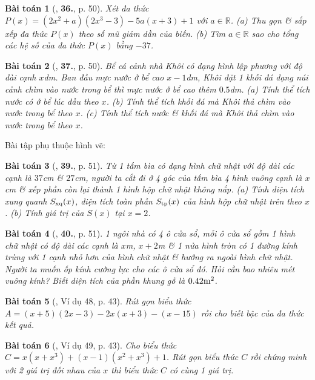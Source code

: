 \documentclass{article}
\numberwithin{equation}{section}
\newtheorem{baitoan}{Bài toán}
\begin{document}
\begin{baitoan}[\cite{SBT_Toan_7_Canh_Dieu_tap_2}, \textbf{36.}, p. 50]
	Xét đa thức $P(x) = (2x^2 + a)(2x^3 - 3) - 5a(x + 3) + 1$ với $a\in\mathbb{R}$. (a) Thu gọn \& sắp xếp đa thức $P(x)$ theo số mũ giảm dần của biến. (b) Tìm $a\in\mathbb{R}$ sao cho tổng các hệ số của đa thức $P(x)$ bằng $-37$.
\end{baitoan}

\begin{baitoan}[\cite{SBT_Toan_7_Canh_Dieu_tap_2}, \textbf{37.}, p. 50]
	Bể cá cảnh nhà Khôi có dạng hình lập phương với độ dài cạnh $x$\emph{dm}. Ban đầu mực nước ở bể cao $x - 1$\emph{dm}, Khôi đặt 1 khối đá dạng núi cảnh chìm vào nước trong bể thì mực nước ở bể cao thêm $0.5$\emph{dm}. (a) Tính thể tích nước có ở bể lúc đầu theo $x$. (b) Tính thể tích khối đá mà Khôi thả chìm vào nước trong bể theo $x$. (c) Tính thể tích nước \& khối đá mà Khôi thả chìm vào nước trong bể theo $x$.
\end{baitoan}
Bài tập phụ thuộc hình vẽ: \cite[\textbf{38.}, p. 50]{SBT_Toan_7_Canh_Dieu_tap_2}

\begin{baitoan}[\cite{SBT_Toan_7_Canh_Dieu_tap_2}, \textbf{39.}, p. 51]
	Từ 1 tấm bìa có dạng hình chữ nhật với độ dài các cạnh là $37$\emph{cm} \& $27$\emph{cm}, người ta cắt đi ở 4 góc của tấm bìa 4 hình vuông cạnh là $x$\emph{cm} \& xếp phần còn lại thành 1 hình hộp chữ nhật không nắp. (a) Tính diện tích xung quanh $S_{\rm xq}(x)$, diện tích toàn phần $S_{\rm tp}(x)$ của hình hộp chữ nhật trên theo $x$. (b) Tính giá trị của $S(x)$ tại $x = 2$.
\end{baitoan}

\begin{baitoan}[\cite{SBT_Toan_7_Canh_Dieu_tap_2}, \textbf{40.}, p. 51]
	1 ngôi nhà có 4 ô cửa sổ, mỗi ô cửa sổ gồm 1 hình chữ nhật có độ dài các cạnh là $x$\emph{m}, $x + 2$\emph{m} \& 1 nửa hình tròn có 1 đường kính trùng với 1 cạnh nhỏ hơn của hình chữ nhật \& hướng ra ngoài hình chữ nhật. Người ta muốn ốp kính cường lực cho các ô cửa sổ đó. Hỏi cần bao nhiêu mét vuông kính? Biết diện tích của phần khung gỗ là $0.42{\rm m}^2$.
\end{baitoan}

\begin{baitoan}[\cite{Tuyen_Toan_7}, Ví dụ 48, p. 43]
	Rút gọn biểu thức $A =  (x + 5)(2x - 3) - 2x(x + 3) - (x - 15)$ rồi cho biết bậc của đa thức kết quả.
\end{baitoan}

\begin{baitoan}[\cite{Tuyen_Toan_7}, Ví dụ 49, p. 43]
	Cho biểu thức $C = x(x + x^3) + (x - 1)(x^2 + x^3) + 1$. Rút gọn biểu thức $C$ rồi chứng minh với 2 giá trị đối nhau của $x$ thì biểu thức $C$ có cùng 1 giá trị.
\end{baitoan}
\end{document}
